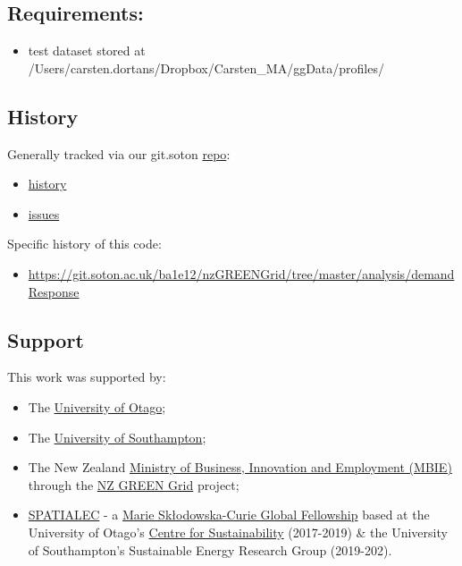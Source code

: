 \documentclass[]{article}
\providecommand{\tightlist}{%
  \setlength{\itemsep}{0pt}\setlength{\parskip}{0pt}}
\theoremstyle{definition}
\theoremstyle{definition}
\theoremstyle{definition}
\theoremstyle{remark}
\begin{document}
\subsection{Requirements:}\label{requirements}

\begin{itemize}
\tightlist
\item
  test dataset stored at
  /Users/carsten.dortans/Dropbox/Carsten\_MA/ggData/profiles/
\end{itemize}

\subsection{History}\label{history}

Generally tracked via our git.soton
\href{https://git.soton.ac.uk/ba1e12/nzGREENGrid}{repo}:

\begin{itemize}
\tightlist
\item
  \href{https://git.soton.ac.uk/ba1e12/nzGREENGrid/commits/master}{history}
\item
  \href{https://git.soton.ac.uk/ba1e12/nzGREENGrid/issues}{issues}
\end{itemize}

Specific history of this code:

\begin{itemize}
\tightlist
\item
  \url{https://git.soton.ac.uk/ba1e12/nzGREENGrid/tree/master/analysis/demandResponse}
\end{itemize}

\subsection{Support}\label{support}

This work was supported by:

\begin{itemize}
\tightlist
\item
  The \href{https://www.otago.ac.nz/}{University of Otago};
\item
  The \href{https://www.southampton.ac.uk/}{University of Southampton};
\item
  The New Zealand \href{http://www.mbie.govt.nz/}{Ministry of Business,
  Innovation and Employment (MBIE)} through the
  \href{https://www.otago.ac.nz/centre-sustainability/research/energy/otago050285.html}{NZ
  GREEN Grid} project;
\item
  \href{http://www.energy.soton.ac.uk/tag/spatialec/}{SPATIALEC} - a
  \href{http://ec.europa.eu/research/mariecurieactions/about-msca/actions/if/index_en.htm}{Marie
  Skłodowska-Curie Global Fellowship} based at the University of Otago's
  \href{http://www.otago.ac.nz/centre-sustainability/staff/otago673896.html}{Centre
  for Sustainability} (2017-2019) \& the University of Southampton's
  Sustainable Energy Research Group (2019-202).
\end{itemize}
\end{document}
